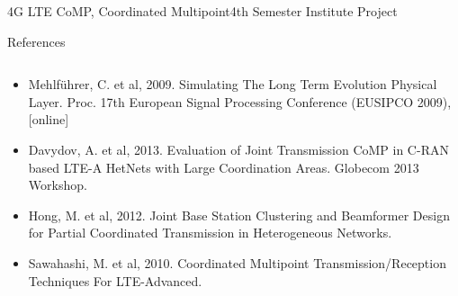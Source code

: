 \documentclass[xcolor={cmyk}]{beamer}
\begin{document}
 \begin{frame}{4G LTE CoMP, Coordinated Multipoint}{4th Semester Institute Project}
	 \begin{block}{References}
	 	\begin{columns}
			\begin{column}{.9\textwidth}
				\begin{itemize}
					\item Mehlführer, C. et al, 2009. Simulating The Long Term Evolution Physical Layer. Proc. 17th European Signal Processing Conference (EUSIPCO 2009), [online]
					\item Davydov, A. et al, 2013. Evaluation of Joint Transmission CoMP in C-RAN based LTE-A HetNets with Large Coordination Areas. Globecom 2013 Workshop.
					\item Hong, M. et al, 2012. Joint Base Station Clustering and Beamformer Design for Partial Coordinated Transmission in Heterogeneous Networks.
					\item Sawahashi, M. et al, 2010. Coordinated Multipoint Transmission/Reception Techniques For LTE-Advanced.
				\end{itemize}
			\end{column}
		\end{columns}
	 \end{block}
 \end{frame}
\end{document}
